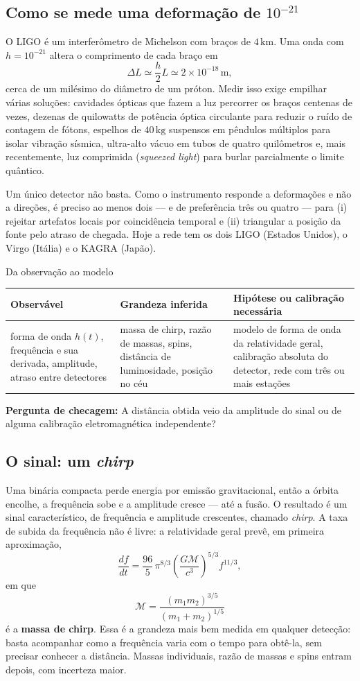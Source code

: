 \documentclass[11pt,a4paper]{article}
\newcommand{\observaveis}[4]{%
  \begin{lessonblock}[borderline west={2pt}{0pt}{astroBlue}]{Da observação ao modelo}%
  \begin{tabular}{>{\raggedright\arraybackslash}p{0.27\textwidth}>{\raggedright\arraybackslash}p{0.27\textwidth}>{\raggedright\arraybackslash}p{0.34\textwidth}}
  \toprule
  Observável & Grandeza inferida & Hipótese ou calibração necessária \\
  \midrule
  #1 & #2 & #3 \\
  \bottomrule
  \end{tabular}

  \textbf{Pergunta de checagem:} #4
  \end{lessonblock}
}
\begin{document}
\subsection*{Como se mede uma deformação de $10^{-21}$}

O LIGO é um interferômetro de Michelson com braços de $4\,\mathrm{km}$. Uma onda com $h=10^{-21}$ altera o comprimento de cada braço em
\[
\Delta L\simeq\frac{h}{2}L\simeq2\times10^{-18}\,\mathrm{m},
\]
cerca de um milésimo do diâmetro de um próton. Medir isso exige empilhar várias soluções: cavidades ópticas que fazem a luz percorrer os braços centenas de vezes, dezenas de quilowatts de potência óptica circulante para reduzir o ruído de contagem de fótons, espelhos de $40\,\mathrm{kg}$ suspensos em pêndulos múltiplos para isolar vibração sísmica, ultra-alto vácuo em tubos de quatro quilômetros e, mais recentemente, luz comprimida (\textit{squeezed light}) para burlar parcialmente o limite quântico.

Um único detector não basta. Como o instrumento responde a deformações e não a direções, é preciso ao menos dois --- e de preferência três ou quatro --- para (i) rejeitar artefatos locais por coincidência temporal e (ii) triangular a posição da fonte pelo atraso de chegada. Hoje a rede tem os dois LIGO (Estados Unidos), o Virgo (Itália) e o KAGRA (Japão).

\observaveis{forma de onda $h(t)$, frequência e sua derivada, amplitude, atraso entre detectores}{massa de chirp, razão de massas, spins, distância de luminosidade, posição no céu}{modelo de forma de onda da relatividade geral, calibração absoluta do detector, rede com três ou mais estações}{A distância obtida veio da amplitude do sinal ou de alguma calibração eletromagnética independente?}

\subsection*{O sinal: um \textit{chirp}}

Uma binária compacta perde energia por emissão gravitacional, então a órbita encolhe, a frequência sobe e a amplitude cresce --- até a fusão. O resultado é um sinal característico, de frequência e amplitude crescentes, chamado \textit{chirp}. A taxa de subida da frequência não é livre: a relatividade geral prevê, em primeira aproximação,
\[
\frac{df}{dt}=\frac{96}{5}\,\pi^{8/3}\left(\frac{G\mathcal{M}}{c^{3}}\right)^{5/3}f^{11/3},
\]
em que
\[
\mathcal{M}=\frac{(m_1m_2)^{3/5}}{(m_1+m_2)^{1/5}}
\]
é a \textbf{massa de chirp}. Essa é a grandeza mais bem medida em qualquer detecção: basta acompanhar como a frequência varia com o tempo para obtê-la, sem precisar conhecer a distância. Massas individuais, razão de massas e spins entram depois, com incerteza maior.
\end{document}
